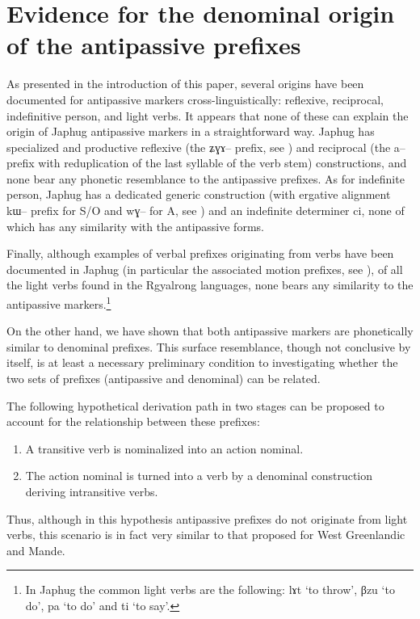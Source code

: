 \documentclass[oldfontcommands,oneside,a4paper,11pt]{article}
\newcommand{\ipa}[1]{{\phon \mbox{#1}}} %
\begin{document}
\section{Evidence for the denominal origin of the  antipassive prefixes} \label{sec:evidence}

As presented in the introduction of this paper, several origins have been documented for antipassive markers cross-linguistically: reflexive, reciprocal, indefinitive person, and light verbs. It appears that none of these   can explain the origin of Japhug antipassive markers in a straightforward way. Japhug has   specialized and productive reflexive (the \ipa{ʑɣɤ--} prefix, see \citealt{jacques10refl}) and reciprocal (the \ipa{a}-- prefix with reduplication of the last syllable of the verb stem) constructions, and none bear any phonetic resemblance to the antipassive prefixes. As for indefinite person, Japhug has a dedicated generic construction (with ergative alignment \ipa{kɯ}-- prefix for S/O and \ipa{wɣ}-- for A, see \citealt{jacques12demotion}) and an indefinite determiner \ipa{ci}, none of which  has  any similarity with the antipassive forms. 

Finally,  although  examples of verbal prefixes originating from verbs have been documented in Japhug (in particular the associated motion prefixes, see \citealt{jacques13harmonization}), of all the light verbs found  in the Rgyalrong languages, none bears any similarity to the antipassive markers.\footnote{In Japhug the common light verbs are the following: \ipa{lɤt} `to throw', \ipa{βzu} `to do', \ipa{pa} `to do' and \ipa{ti} `to say'.}

On the other hand, we have shown that  both antipassive markers are phonetically similar to denominal prefixes. This surface resemblance, though not conclusive by itself, is at least a necessary preliminary condition to investigating whether the two sets of prefixes (antipassive and denominal) can be related.


The following hypothetical  derivation path in two stages  can be proposed to account for the relationship between these prefixes:
\begin{enumerate}


\item A transitive verb is nominalized into an action nominal. 

\item The action nominal is turned into a verb by a denominal construction deriving intransitive verbs.  

\end{enumerate}
Thus, although in this hypothesis antipassive prefixes do not originate from light verbs, this scenario is in fact very similar to that proposed for West Greenlandic and Mande.
\end{document}
